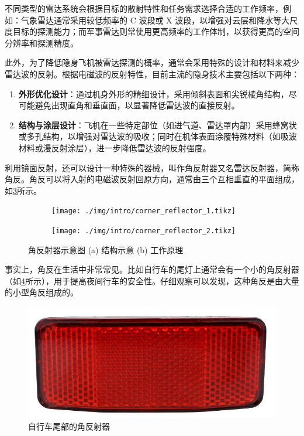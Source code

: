不同类型的雷达系统会根据目标的散射特性和任务需求选择合适的工作频率，例如：气象雷达通常采用较低频率的 C 波段或 X 波段，以增强对云层和降水等大尺度目标的探测能力；而军事雷达则常使用更高频率的工作体制，以获得更高的空间分辨率和探测精度。

此外，为了降低隐身飞机被雷达探测的概率，通常会采用特殊的设计和材料来减少雷达波的反射。根据电磁波的反射特性，目前主流的隐身技术主要包括以下两种：
\begin{enumerate}
    \item \textbf{外形优化设计}：通过机身外形的精细设计，采用倾斜表面和尖锐棱角结构，尽可能避免出现直角和垂直面，以显著降低雷达波的直接反射。
    \item \textbf{结构与涂层设计}：飞机在一些特定部位（如进气道、雷达罩内部）采用蜂窝状或多孔结构，以增强对雷达波的吸收；同时在机体表面涂覆特殊材料（如吸波材料或漫反射涂层），进一步降低雷达波的反射强度。
\end{enumerate}

利用镜面反射，还可以设计一种特殊的器械，叫作角反射器又名雷达反射器，简称角反。角反可以将入射的电磁波反射回原方向，通常由三个互相垂直的平面组成，如\cref{fig_chp1_corner_reflector}所示。

\begin{figure}[htb!]
    \centering
    \begin{subfigure}{.3\textwidth}
        \centering
        \texttt{[image: ./img/intro/corner\_reflector\_1.tikz]}
        \caption{}
        \label{fig_chp1_corner_reflector_1}
    \end{subfigure}
    \begin{subfigure}{.3\textwidth}
        \centering
        \texttt{[image: ./img/intro/corner\_reflector\_2.tikz]}
        \caption{}
        \label{fig_chp1_corner_reflector_2}
    \end{subfigure}
    \caption{角反射器示意图 (a) 结构示意 (b) 工作原理}
    \label{fig_chp1_corner_reflector}
\end{figure}

事实上，角反在生活中非常常见。比如自行车的尾灯上通常会有一个小的角反射器（如\cref{fig_chp1_bike}所示），用于提高夜间行车的安全性。仔细观察可以发现，这种角反是由大量的小型角反组成的。

\begin{figure}[htb!]
    \centering
    \includegraphics[width=.4\textwidth]{./img/intro/bike.jpeg}
    \caption{自行车尾部的角反射器}
    \label{fig_chp1_bike}
\end{figure}

